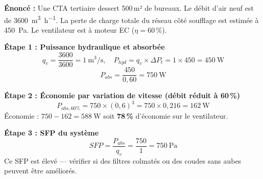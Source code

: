 \begin{exemple}[title=Sélection d'un ventilateur CTA et économie par variation de vitesse]
\textbf{Énoncé :} Une CTA tertiaire dessert 500\,m² de bureaux. Le débit d'air neuf est de \SI{3600}{\cubic\metre\per\hour}. La perte de charge totale du réseau côté soufflage est estimée à \SI{450}{\pascal}. Le ventilateur est à moteur EC ($\eta = 60\,\%$).

\textbf{Étape 1 : Puissance hydraulique et absorbée}
\[
  q_v = \frac{3600}{3600} = \SI{1}{\cubic\metre\per\second}, \quad
  P_{hyd} = q_v \times \Delta P_t = 1 \times 450 = \SI{450}{\watt}
\]
\[
  P_{abs} = \frac{450}{0{,}60} = \SI{750}{\watt}
\]

\textbf{Étape 2 : Économie par variation de vitesse (débit réduit à 60\,\%)}
\[
  P_{abs,60\%} = 750 \times (0{,}6)^3 = 750 \times 0{,}216 = \SI{162}{\watt}
\]
Économie : $750 - 162 = \SI{588}{\watt}$ soit \textbf{78\,\%} d'économie sur le ventilateur.

\textbf{Étape 3 : SFP du système}
\[
  SFP = \frac{P_{abs}}{q_v} = \frac{750}{1} = \SI{750}{\pascal}
\]
Ce SFP est élevé — vérifier si des filtres colmatés ou des coudes sans aubes peuvent être améliorés.
\end{exemple}

